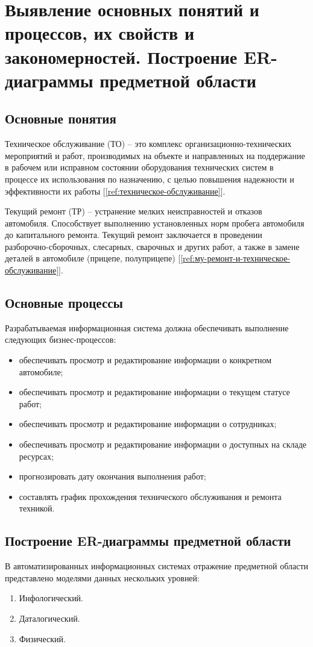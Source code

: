 \documentclass[../nirs.tex]{subfiles}
\begin{document}
\section{Выявление основных понятий и процессов, их свойств и закономерностей.
Построение ER-диаграммы предметной области}

\subsection{Основные понятия}
Техническое обслуживание (ТО) -- это комплекс организационно-технических мероприятий
и работ, производимых на объекте и направленных на поддержание в рабочем или
исправном состоянии оборудования технических систем в процессе их использования
по назначению, с целью повышения надежности и эффективности их работы
[\ref{ref:техническое-обслуживание}].

Текущий ремонт (ТР) -- устранение мелких неисправностей и отказов автомобиля.
Способствует выполнению установленных норм пробега автомобиля до капитального
ремонта. Текущий ремонт заключается в проведении разборочно-сборочных,
слесарных, сварочных и других работ, а также в замене деталей в автомобиле
(прицепе, полуприцепе) [\ref{ref:му-ремонт-и-техническое-обслуживание}].

\subsection{Основные процессы}
Разрабатываемая информационная система должна обеспечивать выполнение следующих
бизнес-процессов:
\begin{itemize}
	\item обеспечивать просмотр и редактирование информации о конкретном
		автомобиле;
	\item обеспечивать просмотр и редактирование информации о текущем статусе
		работ;
	\item обеспечивать просмотр и редактирование информации о сотрудниках;
	\item обеспечивать просмотр и редактирование информации о доступных на
		складе ресурсах;
	\item прогнозировать дату окончания выполнения работ;
	\item составлять график прохождения технического обслуживания и ремонта
		техникой.
\end{itemize}

\subsection{Построение ER-диаграммы предметной области}
В автоматизированных информационных системах отражение предметной области
представлено моделями данных нескольких уровней:
\begin{enumerate}
	\item Инфологический.
	\item Даталогический.
	\item Физический.
\end{enumerate}
\end{document}
